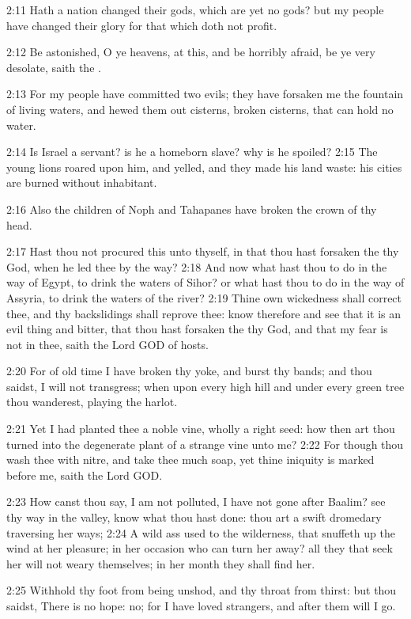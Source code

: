 2:11 Hath a nation changed their gods, which are yet no gods? but my
people have changed their glory for that which doth not profit.

2:12 Be astonished, O ye heavens, at this, and be horribly afraid, be
ye very desolate, saith the \LORD.

2:13 For my people have committed two evils; they have forsaken me the
fountain of living waters, and hewed them out cisterns, broken
cisterns, that can hold no water.

2:14 Is Israel a servant? is he a homeborn slave? why is he spoiled?
2:15 The young lions roared upon him, and yelled, and they made his
land waste: his cities are burned without inhabitant.

2:16 Also the children of Noph and Tahapanes have broken the crown of
thy head.

2:17 Hast thou not procured this unto thyself, in that thou hast
forsaken the \LORD thy God, when he led thee by the way?  2:18 And now
what hast thou to do in the way of Egypt, to drink the waters of
Sihor? or what hast thou to do in the way of Assyria, to drink the
waters of the river?  2:19 Thine own wickedness shall correct thee,
and thy backslidings shall reprove thee: know therefore and see that
it is an evil thing and bitter, that thou hast forsaken the \LORD thy
God, and that my fear is not in thee, saith the Lord GOD of hosts.

2:20 For of old time I have broken thy yoke, and burst thy bands; and
thou saidst, I will not transgress; when upon every high hill and
under every green tree thou wanderest, playing the harlot.

2:21 Yet I had planted thee a noble vine, wholly a right seed: how
then art thou turned into the degenerate plant of a strange vine unto
me?  2:22 For though thou wash thee with nitre, and take thee much
soap, yet thine iniquity is marked before me, saith the Lord GOD.

2:23 How canst thou say, I am not polluted, I have not gone after
Baalim?  see thy way in the valley, know what thou hast done: thou art
a swift dromedary traversing her ways; 2:24 A wild ass used to the
wilderness, that snuffeth up the wind at her pleasure; in her occasion
who can turn her away? all they that seek her will not weary
themselves; in her month they shall find her.

2:25 Withhold thy foot from being unshod, and thy throat from thirst:
but thou saidst, There is no hope: no; for I have loved strangers, and
after them will I go.

